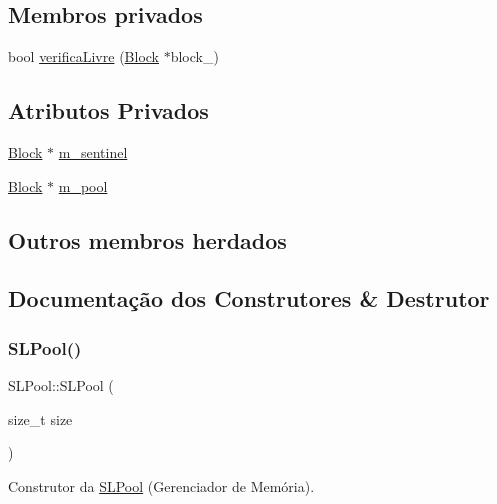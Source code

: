 \subsection*{Membros privados}
\begin{DoxyCompactItemize}
\item 
bool \hyperlink{classSLPool_af70db30fc4a7e39aebbaee06a508ad05}{verifica\+Livre} (\hyperlink{structSLPool_1_1Block}{Block} $\ast$block\+\_\+)
\end{DoxyCompactItemize}
\subsection*{Atributos Privados}
\begin{DoxyCompactItemize}
\item 
\hyperlink{structSLPool_1_1Block}{Block} $\ast$ \hyperlink{classSLPool_a2c72962a10ee6bc7699602b5b79e775e}{m\+\_\+sentinel}
\item 
\hyperlink{structSLPool_1_1Block}{Block} $\ast$ \hyperlink{classSLPool_a7612411c05e5dd1fa06e612e7ffddca3}{m\+\_\+pool}
\end{DoxyCompactItemize}
\subsection*{Outros membros herdados}


\subsection{Documentação dos Construtores \& Destrutor}
\mbox{\label{classSLPool_a9e445324d44fff6652cbb70fbd03a5f8}} 
\subsubsection{\texorpdfstring{S\+L\+Pool()}{SLPool()}}
{\footnotesize\ttfamily S\+L\+Pool\+::\+S\+L\+Pool (\begin{DoxyParamCaption}\item[{size\+\_\+t}]{size }\end{DoxyParamCaption})\hspace{0.3cm}{\ttfamily [explicit]}}



Construtor da \hyperlink{classSLPool}{S\+L\+Pool} (Gerenciador de Memória). 

